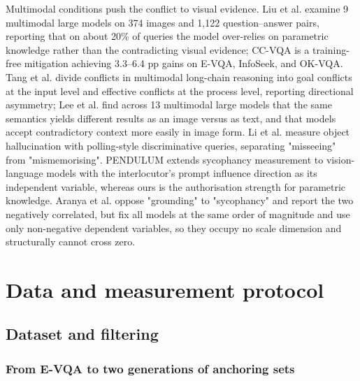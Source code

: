 \documentclass[pdflatex,sn-basic,Numbered]{sn-jnl}
\theoremstyle{thmstyleone}
\theoremstyle{thmstyletwo}
\theoremstyle{thmstylethree}
\begin{document}
Multimodal conditions push the conflict to visual evidence. Liu et al. \cite{ref12} examine 9 multimodal large models on 374 images and 1,122 question–answer pairs, reporting that on about 20\% of queries the model over-relies on parametric knowledge rather than the contradicting visual evidence; CC-VQA \cite{ref13} is a training-free mitigation achieving 3.3–6.4 pp gains on E-VQA, InfoSeek, and OK-VQA. Tang et al. \cite{ref14} divide conflicts in multimodal long-chain reasoning into goal conflicts at the input level and effective conflicts at the process level, reporting directional asymmetry; Lee et al. \cite{ref15} find across 13 multimodal large models that the same semantics yields different results as an image versus as text, and that models accept contradictory context more easily in image form. Li et al. \cite{ref37} measure object hallucination with polling-style discriminative queries, separating "misseeing" from "mismemorising". PENDULUM \cite{ref3} extends sycophancy measurement to vision-language models with the interlocutor's prompt influence direction as its independent variable, whereas ours is the authorisation strength for parametric knowledge. Aranya et al. \cite{ref18} oppose "grounding" to "sycophancy" and report the two negatively correlated, but fix all models at the same order of magnitude and use only non-negative dependent variables, so they occupy no scale dimension and structurally cannot cross zero.

\section{Data and measurement protocol}\label{sec:data}

\subsection{Dataset and filtering}
\label{sec:4-1}

\subsubsection{From E-VQA to two generations of anchoring sets}
\label{sec:4-1-1}
\end{document}
